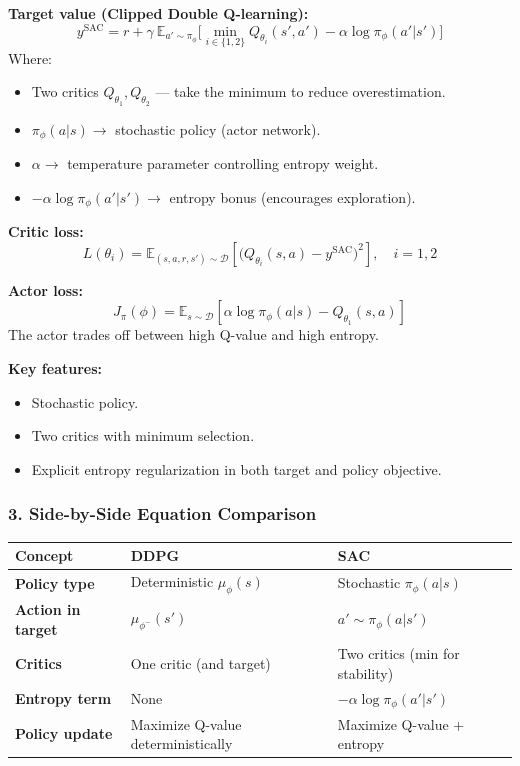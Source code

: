 \documentclass[12pt]{article}
\begin{document}
\textbf{Target value (Clipped Double Q-learning):}
\[
    y^{\text{SAC}} = r + \gamma \ \mathbb{E}_{a' \sim \pi_\phi} \Big[ \min_{i \in \{1,2\}} Q_{\theta_i}(s',a') - \alpha \log \pi_\phi(a'|s') \Big]
\]
Where:
\begin{itemize}
    \item Two critics $Q_{\theta_1}, Q_{\theta_2}$ --- take the minimum to reduce overestimation.
    \item $\pi_\phi(a|s) \to$ stochastic policy (actor network).
    \item $\alpha \to$ temperature parameter controlling entropy weight.
    \item $-\alpha \log \pi_\phi(a'|s') \to$ entropy bonus (encourages exploration).
\end{itemize}

\textbf{Critic loss:}
\[
    L(\theta_i) = \mathbb{E}_{(s,a,r,s') \sim \mathcal{D}} \left[ \big( Q_{\theta_i}(s,a) - y^{\text{SAC}} \big)^2 \right], \quad i = 1, 2
\]

\textbf{Actor loss:}
\[
    J_\pi(\phi) = \mathbb{E}_{s \sim \mathcal{D}} \left[ \alpha \log \pi_\phi(a|s) - Q_{\theta_1}(s,a) \right]
\]
The actor trades off between high Q-value and high entropy.

\textbf{Key features:}
\begin{itemize}
    \item Stochastic policy.
    \item Two critics with minimum selection.
    \item Explicit entropy regularization in both target and policy objective.
\end{itemize}

\subsubsection*{3. Side-by-Side Equation Comparison}
\begin{tabular}{|l|l|l|}
\hline
\textbf{Concept} & \textbf{DDPG} & \textbf{SAC} \\
\hline
\textbf{Policy type} & Deterministic $\mu_\phi(s)$ & Stochastic $\pi_\phi(a|s)$ \\
\hline
\textbf{Action in target} & $\mu_{\phi^-}(s')$ & $a' \sim \pi_\phi(a|s')$ \\
\hline
\textbf{Critics} & One critic (and target) & Two critics (min for stability) \\
\hline
\textbf{Entropy term} & None & $-\alpha \log \pi_\phi(a'|s')$ \\
\hline
\textbf{Policy update} & Maximize Q-value deterministically & Maximize Q-value + entropy \\
\hline
\end{tabular}
\end{document}
